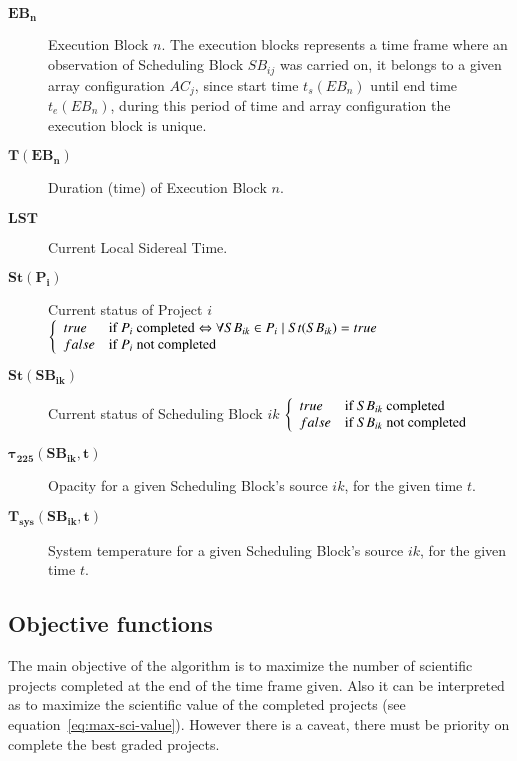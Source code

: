 \begin{description}
\item[$\mathbf{EB_n}$] Execution Block $n$. The execution blocks represents a time frame where an observation of Scheduling Block $SB_{ij}$ was carried on, it belongs to a given array configuration $AC_j $, since start time $t_s(EB_n)$ until end time $t_e(EB_n)$, during this period of time and array configuration the execution block is unique.

\item[$\mathbf{T(EB_n)}$] Duration (time) of Execution Block $n$.

\item[$\mathbf{LST}$] Current Local Sidereal Time.

\item[$\mathbf{St(P_i)}$] Current status of Project $i$  $
\left\{
\begin{array}{l l} 
true & \mbox{if  } P_i \mbox{ completed} \Leftrightarrow \forall SB_{ik} \in P_i \mid St(SB_{ik}) = true\\
false & \mbox{if  } P_i \mbox{ not completed} \\
\end{array}
\right .$

\item[$\mathbf{St(SB_{ik})}$] Current status of Scheduling Block $ik$  $
\left\{
\begin{array}{l l} 
true & \mbox{if  } SB_{ik} \mbox{ completed} \\
false & \mbox{if  } SB_{ik} \mbox{ not completed} \\
\end{array}
\right .$

\item[$\mathbf{\tau_{225}(SB_{ik}, t)}$] Opacity for a given Scheduling Block's source $ik$, for the given time $t$.

\item[$\mathbf{T_{sys}(SB_{ik}, t)}$] System temperature for a given Scheduling Block's source $ik$, for the given time $t$.

\end{description}

\subsection{Objective functions}

The main objective of the algorithm is to maximize the number of scientific projects completed at the end of the time frame given. Also it can be interpreted as to maximize the scientific value of the completed projects (see equation~\ref{eq:max-sci-value}). However there is a caveat, there must be priority on complete the best graded projects.

